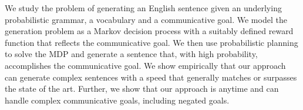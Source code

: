 %
%
%

\noindent       %
  We study the problem of generating an English sentence given an
  underlying probabilistic grammar, a vocabulary and a communicative
  goal. We model the generation problem as a Markov decision process
  with a suitably defined reward function that reflects the
  communicative goal. We then use probabilistic planning to solve the
  MDP and generate a sentence that, with high probability,
  accomplishes the communicative goal. We show empirically that our
  approach can generate complex sentences with a speed that generally
  matches or surpasses the state of the art. Further, we show that our
  approach is anytime and can handle complex communicative goals,
  including negated goals.